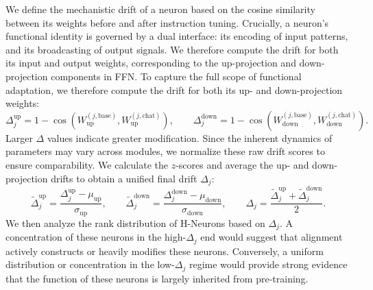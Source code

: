 \documentclass[dvipsnames]{article}
\begin{document}
We define the mechanistic drift of a neuron based on the cosine similarity between its weights before and after instruction tuning. Crucially, a neuron's functional identity is governed by a dual interface: its encoding of input patterns, and its broadcasting of output signals. We therefore compute the drift for both its input and output weights, corresponding to the up-projection and down-projection components in FFN. To capture the full scope of functional adaptation, we therefore compute the drift for both its up- and down-projection weights:
\[
\Delta_j^\text{up} = 1 - \cos(W_{\text{up}}^{(j, \text{base})}, W_{\text{up}}^{(j, \text{chat})}),\qquad
\Delta_j^\text{down} = 1 - \cos(W_{\text{down}}^{(j, \text{base})}, W_{\text{down}}^{(j, \text{chat})}).
\]
Larger $\Delta$ values indicate greater modification.
Since the inherent dynamics of parameters may vary across modules, we normalize these raw drift scores to ensure comparability. We calculate the $z$-scores and average the up- and down-projection drifts to obtain a unified final drift $\Delta_j$:
\[
\tilde{\Delta}_j^\text{up} = \frac{\Delta_j^\text{up}-\mu_\text{up}}{\sigma_\text{up}},\qquad
\tilde{\Delta}_j^\text{down} = \frac{\Delta_j^\text{down}-\mu_\text{down}}{\sigma_\text{down}},\qquad
\Delta_j = \frac{\tilde{\Delta}_j^\text{up} + \tilde{\Delta}_j^\text{down}}{2}.
\]
We then analyze the rank distribution of H-Neurons based on $\Delta_j$. A concentration of these neurons in the high-$\Delta_j$ end would suggest that alignment actively constructs or heavily modifies these neurons. Conversely, a uniform distribution or concentration in the low-$\Delta_j$ regime would provide strong evidence that the function of these neurons is largely inherited from pre-training.


\end{document}
